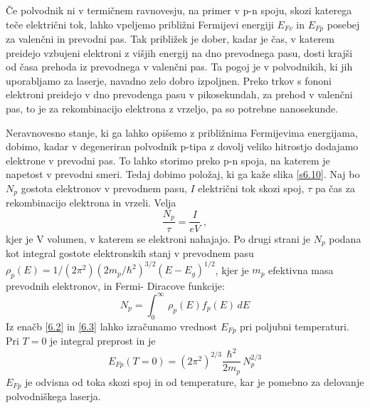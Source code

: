 Če polvodnik ni v termičnem ravnovesju, na primer v p-n spoju, skozi
katerega teče električni tok, lahko vpeljemo približni Fermijevi energiji 
$E_{Fv}$ in $E_{Fp}$ posebej za valenčni in prevodni pas. Tak približek je
dober, kadar je čas, v katerem preidejo vzbujeni elektroni z višjih
energij na dno prevodnega pasu, dosti krajši od časa prehoda iz prevodnega
v valenčni pas. Ta pogoj je v polvodnikih, ki jih uporabljamo za laserje,
navadno zelo dobro izpoljnen. Preko trkov s fononi elektroni preidejo v dno
prevodenga pasu v pikosekundah, za prehod v valenčni pas, to je za
rekombinacijo elektrona z vrzeljo, pa so potrebne nanosekunde.

Neravnovesno stanje, ki ga lahko opišemo z približnima Fermijevima
energijama, dobimo, kadar v degeneriran polvodnik p-tipa z dovolj veliko
hitrostjo dodajamo elektrone v prevodni pas. To lahko storimo preko p-n
spoja, na katerem je napetost v prevodni smeri. Tedaj dobimo položaj, ki ga
kaže slika \ref{s6.10}. Naj bo $N_p$ gostota elektronov v prevodnem pasu, $I
$ električni tok skozi spoj, $\tau$ pa čas za rekombinacijo elektrona in
vrzeli. Velja 
\begin{equation}  \label{6.2}
\frac{N_p}{\tau}=\frac{I}{e V}\;,
\end{equation}
kjer je V volumen, v katerem se elektroni nahajajo. Po drugi strani je $N_p$
podana kot integral gostote elektronskih stanj v prevodnem pasu $%
\rho_p(E)=1/(2\pi^2)(2m_p/\hbar^2)^{3/2}(E-E_g)^{1/2}$, kjer je $m_p$
efektivna masa prevodnih elektronov, in Fermi- Diracove funkcije: 
\begin{equation}  \label{6.3}
N_p=\int_{0}^{\infty}\,\rho_p(E)f_p(E)\,dE
\end{equation}
Iz enačb \ref{6.2} in \ref{6.3} lahko izračunamo vrednost $E_{Fp}$ pri
poljubni temperaturi. Pri $T=0$ je integral preprost in je 
\begin{equation}  \label{6.4}
E_{Fp}(T=0)=(2\pi^2)^{2/3}\frac{\hbar^2}{2m_p}\,N_p^{2/3}
\end{equation}
$E_{Fp}$ je odvisna od toka skozi spoj in od temperature, kar je pomebno za
delovanje polvodniškega laserja.

